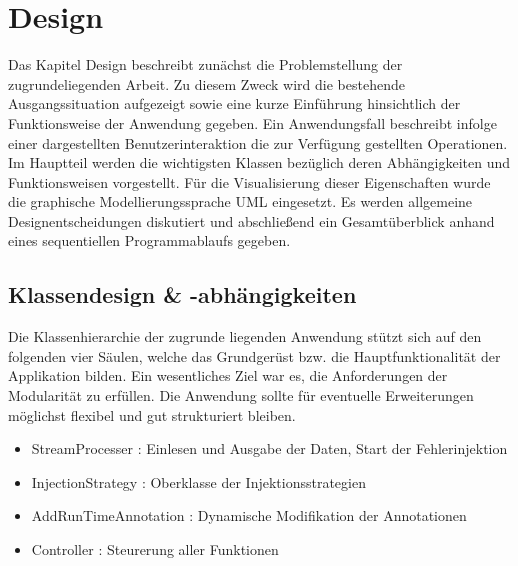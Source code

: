 \chapter{Design}\vspace{1cm}
Das Kapitel Design beschreibt zunächst die Problemstellung der zugrundeliegenden Arbeit. Zu diesem Zweck wird die bestehende Ausgangssituation aufgezeigt sowie eine kurze Einführung hinsichtlich der Funktionsweise der Anwendung gegeben. Ein Anwendungsfall beschreibt infolge einer dargestellten Benutzerinteraktion die zur Verfügung gestellten Operationen. Im Hauptteil werden die wichtigsten Klassen bezüglich deren Abhängigkeiten und Funktionsweisen vorgestellt. Für die Visualisierung dieser Eigenschaften wurde die graphische Modellierungssprache UML  eingesetzt. Es werden allgemeine Designentscheidungen diskutiert und abschlie\ss end ein Gesamt\"uberblick anhand eines sequentiellen Programmablaufs gegeben.
%




\section{Klassendesign \& -abhängigkeiten}
%
Die Klassenhierarchie der zugrunde liegenden Anwendung st\"utzt sich auf den folgenden vier S\"aulen, welche das Grundgerüst bzw. die Hauptfunktionalität der Applikation bilden. Ein wesentliches Ziel war es, die Anforderungen der Modularit\"at zu erf\"ullen. Die Anwendung sollte für eventuelle Erweiterungen m\"oglichst flexibel und gut strukturiert bleiben.
%
	\begin{itemize}
		\item StreamProcesser : Einlesen und Ausgabe der Daten, Start der Fehlerinjektion
		\item InjectionStrategy : Oberklasse der Injektionsstrategien
		\item AddRunTimeAnnotation : Dynamische Modifikation der Annotationen
		\item Controller : Steurerung aller Funktionen
	\end{itemize}	 
%

%

%

%

%

%

%


